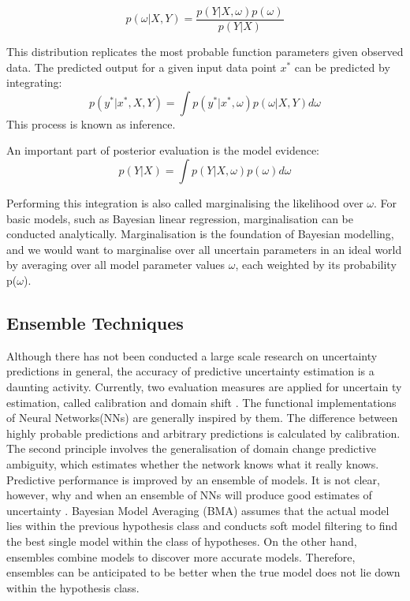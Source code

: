 \documentclass[journal]{IEEEtran}
\begin{document}
\begin{equation*}
    p(\omega|X,Y) = \frac{p(Y|X,\omega)p(\omega)}{p(Y|X)}
\end{equation*}

This distribution replicates the most probable function parameters given observed
data. The predicted output for a given input data point $x^*$ can be predicted by integrating:
\begin{equation*}
    p(y^*|x^*,X,Y) = \int p(y^*|x^*,\omega)p(\omega|X,Y)d\omega
\end{equation*}
This process is known as inference.

An important part of posterior evaluation is the model evidence:
\begin{equation*}
    p(Y|X) = \int p(Y|X,\omega)p(\omega)d\omega
\end{equation*}

Performing this integration is also called marginalising the likelihood over $\omega$.
For basic models, such as Bayesian
linear regression, marginalisation can be conducted analytically.
Marginalisation is the foundation of Bayesian
modelling, and we would want to marginalise over all uncertain parameters in an ideal world by averaging over all model parameter values $\omega$, each weighted by its probability
p($\omega$)\cite{abdar2020review}.

\subsection{Ensemble Techniques}
Although there has not been conducted a large scale research on uncertainty predictions in
general, the accuracy of predictive uncertainty estimation is a daunting activity.
Currently, two evaluation measures are applied for uncertain
ty estimation,
called calibration and domain shift \cite{pearce2018uncertainty}.
The functional implementations of Neural Networks(NNs)
are generally inspired by them.
The difference between highly probable predictions and arbitrary predictions is calculated by calibration.
The second principle involves the generalisation of domain
change predictive ambiguity, which estimates whether the network knows
what it really knows.
Predictive performance is improved
by an ensemble of models.
It is not clear, however, why and when an
ensemble of NNs will produce good estimates of uncertainty \cite{abdar2020review}. 
Bayesian Model Averaging (BMA) assumes that the actual model lies within the previous hypothesis class
and conducts soft model filtering to find the best single model within the class of hypotheses. On the other hand, ensembles
combine models to discover more accurate models. Therefore, ensembles
can be anticipated to be better when the true model
does not lie down within the hypothesis class.
\end{document}
